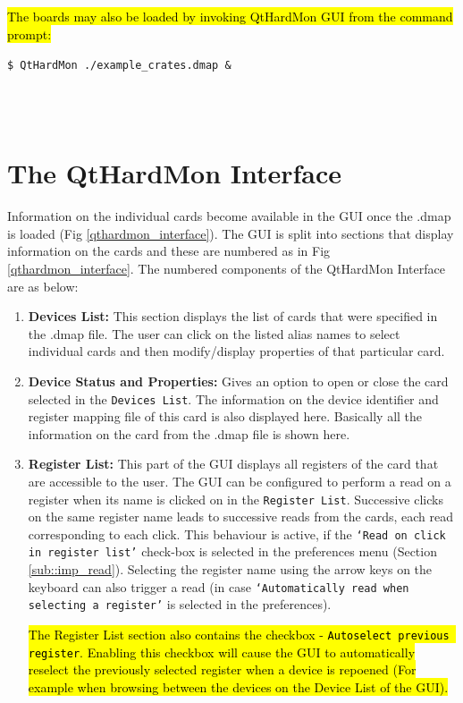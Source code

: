 \hl{The boards may also be loaded by invoking QtHardMon GUI from the command prompt:}
\\\centerline{\texttt{\$ QtHardMon ./example\_crates.dmap \&}} \\\\


\section{The QtHardMon Interface} Information on the individual cards become
available in the GUI once the .dmap is loaded (Fig \ref{qthardmon_interface}).
The GUI is split into sections that display information on the cards and these
are numbered as in Fig \ref{qthardmon_interface}. The numbered components of the
QtHardMon Interface are as below: 
\begin{enumerate} 
    \item \textbf{Devices List:}
    This section displays the list of cards that were specified in the
    .dmap file. The user can click on the listed alias names to select
    individual cards and then modify/display properties of that
    particular card. 

	\item \textbf{Device Status and Properties:} Gives an option to open or close
    the card selected in the \texttt{Devices List}. The information on the
    device identifier and register mapping file of this card is also displayed
    here. Basically all the information on the card from the .dmap file is shown
    here. 

	\item \textbf{Register List:} This part of the GUI displays all registers of the
    card that are accessible to the user. The GUI can be configured to perform a
    read on a register when its name is clicked on in the \texttt{Register
    List}. Successive clicks on the same register name leads to successive reads
    from the cards, each read corresponding to each click. This behaviour is
    active, if the \texttt{`Read on click in register list'} check-box is
    selected in the preferences menu (Section \ref{sub::imp_read}). Selecting
    the register name using the arrow keys on the keyboard can also trigger a
    read (in case \texttt{`Automatically read when selecting a register'} is
    selected in the preferences).
	
	\hl{The Register List section also contains  the checkbox   -
	\texttt{Autoselect previous register}. Enabling this checkbox will cause the GUI to automatically 
	reselect the previously selected register when a device is repoened
	(For example when browsing between the devices on the Device List of the GUI).}
	

\end{enumerate}
